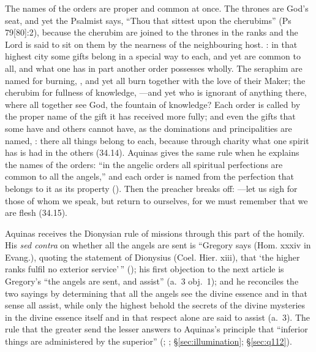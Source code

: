 The names of the orders are proper and common at once. The thrones are God's
seat, and yet the Psalmist says, ``Thou that sittest upon the cherubims''
(Ps 79[80]:2), because the cherubim are joined to the thrones in the
ranks and the Lord is said to sit on them by the nearness of the
neighbouring host. : in that highest city
some gifts belong in a special way to each, and yet are common to all, and
what one has in part another order possesses wholly. The seraphim are named
for burning, , and yet
all burn together with the love of their Maker; the cherubim for fullness of
knowledge, ---and yet who is ignorant of anything there,
where all together see God, the fountain of knowledge? Each order is called
by the proper name of the gift it has received more fully; and even the
gifts that some have and others cannot have, as the dominations and
principalities are named, : there all things belong to
each, because through charity what one spirit has is had in the others
(34.14). Aquinas gives the same rule when he explains the names of the
orders: ``in the angelic orders all spiritual perfections are common to all
the angels,'' and each order is named from the perfection that belongs to it
as its property (). Then the preacher breaks off: ---let us sigh for those of whom we speak, but return to ourselves,
for we must remember that we are flesh (34.15).

Aquinas receives the Dionysian rule of missions through this part of the
homily. His \emph{sed contra} on whether all
the angels are sent is ``Gregory says (Hom. xxxiv in Evang.), quoting the
statement of Dionysius (Coel. Hier. xiii), that `the higher ranks fulfil no
exterior service'\,'' (); his first objection to the next
article is Gregory's ``the angels are sent, and assist'' (a.~3 obj.~1); and
he reconciles the two sayings by determining that all the angels see the
divine essence and in that sense all assist, while only the highest behold
the secrets of the divine mysteries in the divine essence itself and in
that respect alone are said to assist (a.~3). The rule that the greater send
the lesser answers to Aquinas's principle that ``inferior things are
administered by the superior'' (; ;
\S\ref{sec:illumination}; \S\ref{sec:q112}).

